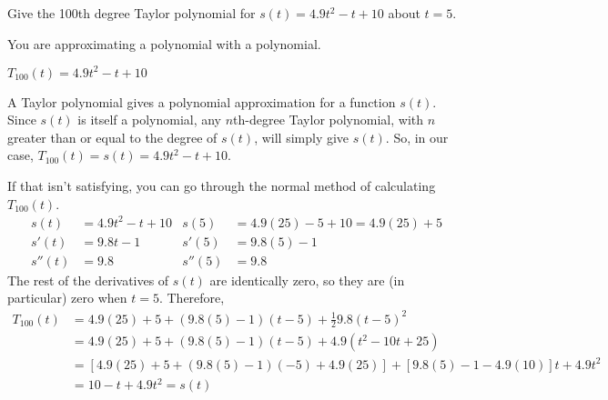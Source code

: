 \begin{Mquestion}
Give the 100th degree Taylor polynomial for $s(t)=4.9t^2-t+10$ about $t=5$.
\end{Mquestion}
\begin{hint}
You are approximating a polynomial with a polynomial.
\end{hint}
\begin{answer}
$T_{100}(t)=4.9t^2-t+10$
\end{answer}
\begin{solution}
A Taylor polynomial gives a polynomial approximation for a function $s(t)$. Since $s(t)$ is itself a polynomial, any $n$th-degree Taylor polynomial, with $n$ greater than or equal to the degree of $s(t)$, will simply give $s(t)$. So, in our case, $T_{100}(t)=s(t)=4.9t^2-t+10$.
\medskip

If that isn't satisfying, you can go through the normal method of calculating $T_{100}(t)$.
\begin{align*}
s(t)&=4.9t^2-t+10 & s(5)&=4.9(25)-5+10=4.9(25)+5\\
s'(t)&=9.8t-1 & s'(5)&=9.8(5)-1\\
s''(t)&=9.8 & s''(5)&=9.8
\end{align*}
The rest of the derivatives of $s(t)$ are identically zero, so they are (in particular) zero when $t=5$. Therefore,
\begin{align*}
T_{100}(t)&=4.9(25)+5+(9.8(5)-1)(t-5)+\frac{1}{2}9.8(t-5)^2\\
&=4.9(25)+5+(9.8(5)-1)(t-5)+4.9(t^2-10t+25)\\
&=[4.9(25)+5+(9.8(5)-1)(-5)+4.9(25)]+[9.8(5)-1-4.9(10)]t+4.9t^2\\
&=10-t+4.9t^2=s(t)
\end{align*}
\end{solution}

